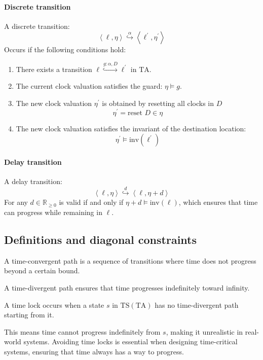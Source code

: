 \paragraph*{Discrete transition}
A discrete transition:
\[\left\langle \ell,\eta\right\rangle\overset{\alpha}{\hookrightarrow}\left\langle \ell^\prime,\eta^\prime\right\rangle\] 
Occurs if the following conditions hold:
\begin{enumerate}
    \item There exists a transition $\ell\overset{g:\alpha,D}{\hookrightarrow}\ell^\prime$ in $\text{TA}$. 
    \item The current clock valuation satisfies the guard: $\eta\models g$. 
    \item The new clock valuation $\eta^\prime$ is obtained by resetting all clocks in $D$
        \[\eta^\prime=\text{reset }D \in \eta\]
    \item The new clock valuation satisfies the invariant of the destination location: 
        \[\eta^\prime\models\text{inv}(\ell^\prime)\]
\end{enumerate}

\paragraph*{Delay transition}
A delay transition:
\[\left\langle \ell,\eta\right\rangle\overset{d}{\hookrightarrow}\left\langle \ell,\eta+d\right\rangle\] 
For any $d\in\mathbb{R}_{\geq 0}$ is valid if and only if $\eta+d\models\text{inv}(\ell)$, which ensures that time can progress while remaining in $\ell$.

\subsection{Definitions and diagonal constraints}
\begin{definition}
    A time-convergent path is a sequence of transitions where time does not progress beyond a certain bound.
\end{definition}
\noindent A time-divergent path ensures that time progresses indefinitely toward infinity.
\begin{definition}
    A time lock occurs when a state $s$ in $\text{TS}(\text{TA})$ has no time-divergent path starting from it.
\end{definition}
\noindent This means time cannot progress indefinitely from $s$, making it unrealistic in real-world systems.
Avoiding time locks is essential when designing time-critical systems, ensuring that time always has a way to progress.

